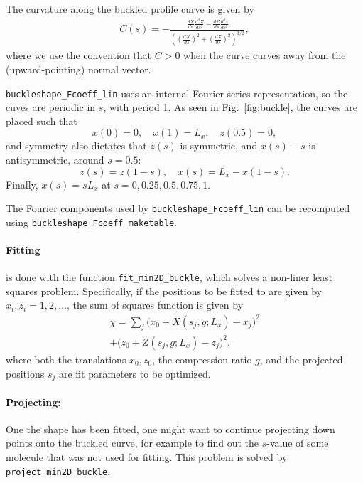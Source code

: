 \documentclass[11pt,a4paper,twocolumn]{article}
\begin{document}
The curvature along the buckled profile curve is given by
\begin{multline}
  C(s)=-\frac{\frac{dX}{ds}\frac{d^2Z}{ds^2}-\frac{dZ}{ds}\frac{d^2z}{ds^2}}{
    \left(
    \left(\frac{dX}{ds}\right)^2+\left(\frac{dZ}{ds}\right)^2
    \right)^{3/2}},
\end{multline}
where we use the convention that $C>0$ when the curve curves away from
the (upward-pointing) normal vector.

\texttt{buckleshape\_Fcoeff\_lin} uses an internal Fourier series
representation, so the cuves are periodic in $s$, with period 1. As
seen in Fig.~\ref{fig:buckle}, the curves are placed such that
\begin{equation}
x(0)=0,\quad
x(1)=L_x,\quad 
z(0.5)=0,
\end{equation}
and symmetry also dictates that $z(s)$ is symmetric, 
and $x(s)-s$ is antisymmetric,  around $s=0.5$:
\begin{equation}
  z(s)=z(1-s),\quad
  x(s)=L_x-x(1-s).
\end{equation}
Finally, $x(s)=sL_x$ at $s=0,0.25,0.5,0.75,1$.

The Fourier components used by \texttt{buckleshape\_Fcoeff\_lin} can
be recomputed using \texttt{buckleshape\_Fcoeff\_maketable}.

\paragraph{Fitting}
is done with the function \texttt{fit\_min2D\_buckle}, which solves a
non-liner least squares problem. Specifically, if the positions to be
fitted to are given by $x_i,z_i=1,2,\ldots$, the sum of squares
function is given by
\begin{multline}
    \chi=\sum_j
    \big(x_0+X(s_j,g;L_x)-x_j\big)^2\\
   +\big(z_0+Z(s_j,g;L_x)-z_j\big)^2,
\end{multline}
where both the translations $x_0,z_0$, the compression ratio $g$, and
the projected positions $s_j$ are fit parameters to be optimized.
\paragraph{Projecting:}
One the shape has been fitted, one might want to continue projecting
down points onto the buckled curve, for example to find out the
$s$-value of some molecule that was not used for fitting. This problem
is solved by \texttt{project\_min2D\_buckle}.

 

\end{document}
